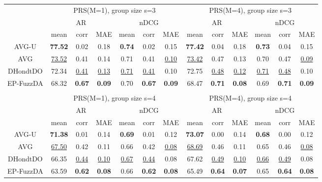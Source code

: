 \begin{tabular}{ c | c c c | c c c || c c c | c c c}

\multicolumn{1}{c}{} & \multicolumn{6}{c}{PRS(M=1), group size s=3} & \multicolumn{6}{c}{PRS(M=4), group size s=3} \\
\multicolumn{1}{c}{} & \multicolumn{3}{c}{AR} & \multicolumn{3}{c}{nDCG} & \multicolumn{3}{c}{AR} & \multicolumn{3}{c}{nDCG} \\
& mean & corr & MAE & mean & corr & MAE & mean & corr & MAE & mean & corr & MAE \\
\hline
AVG-U & \textbf{77.52} & 0.02 & 0.18 & \textbf{0.74} & 0.02 & 0.15 & \textbf{77.42} & 0.04 & 0.18 & \textbf{0.73} & 0.04 & 0.15 \\
AVG & \underline{73.52} & 0.41 & 0.14 & 0.71 & 0.41 & \underline{0.10} & \underline{73.42} & 0.47 & 0.13 & 0.70 & 0.47 & \underline{0.09} \\
DHondtDO & 72.34 & \underline{0.41} & \underline{0.13} & \underline{0.71} & \underline{0.41} & 0.10 & 72.75 & \underline{0.48} & \underline{0.12} & \underline{0.71} & \underline{0.48} & 0.10 \\
EP-FuzzDA & 68.32 & \textbf{0.67} & \textbf{0.09} & 0.70 & \textbf{0.67} & \textbf{0.09} & 68.47 & \textbf{0.71} & \textbf{0.08} & 0.69 & \textbf{0.71} & \textbf{0.09} \\

\multicolumn{12}{c}{} \\
\multicolumn{1}{c}{} & \multicolumn{6}{c}{PRS(M=1), group size s=4} & \multicolumn{6}{c}{PRS(M=4), group size s=4} \\
\multicolumn{1}{c}{} & \multicolumn{3}{c}{AR} & \multicolumn{3}{c}{nDCG} & \multicolumn{3}{c}{AR} & \multicolumn{3}{c}{nDCG} \\
& mean & corr & MAE & mean & corr & MAE & mean & corr & MAE & mean & corr & MAE \\
\hline
AVG-U & \textbf{71.38} & 0.01 & 0.14 & \textbf{0.69} & 0.01 & 0.12 & \textbf{73.07} & 0.00 & 0.14 & \textbf{0.68} & 0.00 & 0.12 \\
AVG & \underline{67.50} & 0.42 & 0.11 & 0.66 & 0.42 & \underline{0.08} & \underline{68.69} & 0.46 & 0.11 & 0.65 & 0.46 & \underline{0.08} \\
DHondtDO & 66.35 & \underline{0.44} & \underline{0.10} & \underline{0.67} & \underline{0.44} & 0.08 & 67.62 & \underline{0.49} & \underline{0.10} & \underline{0.66} & \underline{0.49} & 0.08 \\
EP-FuzzDA & 63.59 & \textbf{0.62} & \textbf{0.08} & 0.66 & \textbf{0.62} & \textbf{0.08} & 65.49 & \textbf{0.64} & \textbf{0.07} & 0.65 & \textbf{0.64} & \textbf{0.08} \\


\end{tabular}
